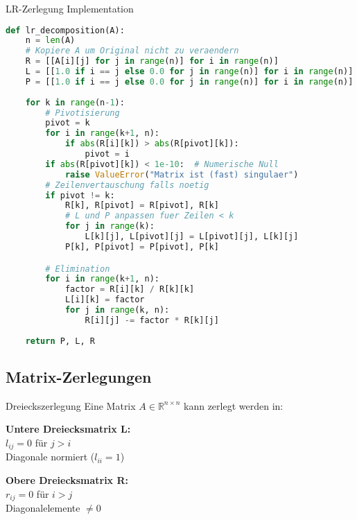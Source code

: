 \begin{examplecode}{LR-Zerlegung Implementation}
\begin{lstlisting}[language=Python, style=basesmol]
def lr_decomposition(A):
    n = len(A)
    # Kopiere A um Original nicht zu veraendern
    R = [[A[i][j] for j in range(n)] for i in range(n)]
    L = [[1.0 if i == j else 0.0 for j in range(n)] for i in range(n)]
    P = [[1.0 if i == j else 0.0 for j in range(n)] for i in range(n)]
    
    for k in range(n-1):
        # Pivotisierung
        pivot = k
        for i in range(k+1, n):
            if abs(R[i][k]) > abs(R[pivot][k]):
                pivot = i
        if abs(R[pivot][k]) < 1e-10:  # Numerische Null
            raise ValueError("Matrix ist (fast) singulaer")
        # Zeilenvertauschung falls noetig
        if pivot != k:
            R[k], R[pivot] = R[pivot], R[k]
            # L und P anpassen fuer Zeilen < k
            for j in range(k):
                L[k][j], L[pivot][j] = L[pivot][j], L[k][j]
            P[k], P[pivot] = P[pivot], P[k]

        # Elimination
        for i in range(k+1, n):
            factor = R[i][k] / R[k][k]
            L[i][k] = factor
            for j in range(k, n):
                R[i][j] -= factor * R[k][j]
               
    return P, L, R
\end{lstlisting}
\end{examplecode}

\subsection{Matrix-Zerlegungen}

\begin{definition}{Dreieckszerlegung}
Eine Matrix $A \in \mathbb{R}^{n\times n}$ kann zerlegt werden in:
\vspace{1mm}\\
\begin{minipage}[t]{0.5\textwidth}
    \textbf{Untere Dreiecksmatrix L:}\\
    $l_{ij} = 0$ für $j > i$\\
    Diagonale normiert ($l_{ii}=1$)
\end{minipage}
\hspace{3mm}
\begin{minipage}[t]{0.45\textwidth}
    \textbf{Obere Dreiecksmatrix R:}\\
    $r_{ij} = 0$ für $i > j$\\
    Diagonalelemente $\neq 0$
\end{minipage}
\end{definition}


